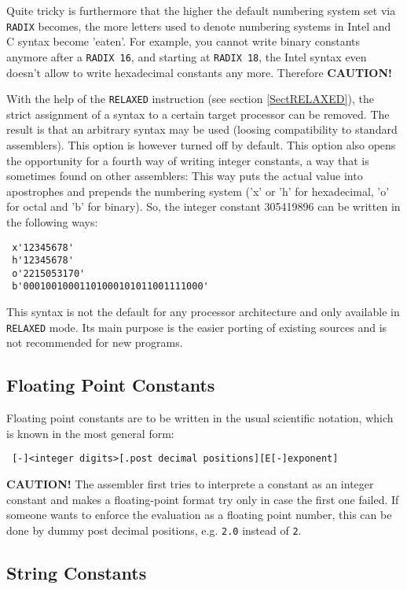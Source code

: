 \documentclass[12pt,twoside]{report}
\newcommand{\bb}[1]{{\bf #1}}
\newcommand{\tty}[1]{{\tt #1}}
\begin{document}
Quite tricky is furthermore that the higher the default numbering system
set via {\tt RADIX} becomes, the more letters used to denote numbering
systems in Intel and C syntax become 'eaten'.  For example, you cannot
write binary constants anymore after a {\tt RADIX 16}, and starting at
{\tt RADIX 18}, the Intel syntax even doesn't allow to write hexadecimal
constants any more.  Therefore {\bf CAUTION!}

With the help of the \tty{RELAXED} instruction (see section \ref{SectRELAXED}),
the strict assignment of a syntax to a certain target processor can be
removed.  The result is that an arbitrary syntax may be used (loosing
compatibility to standard assemblers).  This option is however turned off
by default.  This option also opens the opportunity for a fourth way of
writing integer constants, a way that is sometimes found on other
assemblers: This way puts the actual value into apostrophes and prepends
the numbering system ('x' or 'h' for hexadecimal, 'o' for octal and 'b'
for binary).  So, the integer constant 305419896 can be written in the
following ways:
\begin{verbatim}
 x'12345678'
 h'12345678'
 o'2215053170'
 b'00010010001101000101011001111000'
\end{verbatim}
This syntax is not the default for any processor architecture and only
available in \tty{RELAXED} mode.  Its main purpose is the easier porting
of existing sources and is not recommended for new programs.

\subsection{Floating Point Constants}

Floating point constants are to be written in the usual scientific
notation, which is known in the most general form:
\begin{verbatim}
 [-]<integer digits>[.post decimal positions][E[-]exponent]
\end{verbatim}
\bb{CAUTION!} The assembler first tries to interprete a constant as an
integer constant and makes a floating-point format try only in case
the first one failed.  If someone wants to enforce the evaluation as
a floating point number, this can be done by dummy post decimal
positions, e.g.  \tty{2.0} instead of \tty{2}.

\subsection{String Constants}
\label{SectStringConsts}
\end{document}
